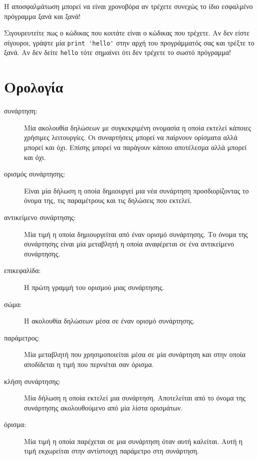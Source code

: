 \documentclass[10pt]{book}
\begin{document}
Η αποσφαλμάτωση μπορεί να είναι χρονοβόρα αν τρέχετε συνεχώς το ίδιο 
εσφαλμένο πρόγραμμα ξανά και ξανά!

Σιγουρευτείτε πως ο κώδικας που κοιτάτε είναι ο κώδικας που τρέχετε.
Αν δεν είστε σίγουροι, γράψτε μία \verb"print 'hello'" 
στην αρχή του προγράμματός σας και τρέξτε το ξανά. Αν δεν δείτε  
\verb"hello" τότε σημαίνει ότι δεν τρέχετε το σωστό πρόγραμμα!



\section{Ορολογία}

\begin{description}

\item[συνάρτηση:] Μία ακολουθία δηλώσεων με συγκεκριμένη ονομασία η οποία εκτελεί κάποιες χρήσιμες λειτουργίες. Οι συναρτήσεις μπορεί να παίρνουν ορίσματα αλλά μπορεί και όχι. Επίσης μπορεί να παράγουν κάποιο αποτέλεσμα αλλά μπορεί και όχι.

\item[ορισμός συνάρτησης:] Είναι μία δήλωση η οποία δημιουργεί μια νέα συνάρτηση προσδιορίζοντας το όνομα της, τις παραμέτρους και τις δηλώσεις που εκτελεί.

\item[αντικείμενο συνάρτησης:] Μία τιμή η οποία δημιουργείται από έναν ορισμό συνάρτησης. Το όνομα της συνάρτησης είναι μία μεταβλητή η οποία αναφέρεται σε ένα αντικείμενο συνάρτησης.

\item[επικεφαλίδα:] Η πρώτη γραμμή του ορισμού μιας συνάρτησης.

\item[σώμα:] Η ακολουθία δηλώσεων μέσα σε έναν ορισμό συνάρτησης.

\item[παράμετρος:] Μία μεταβλητή που χρησιμοποιείται μέσα σε μία συνάρτηση και 
στην οποία αποδίδεται η τιμή που περνιέται σαν όρισμα.

\item[κλήση συνάρτησης:] Μία δήλωση η οποία εκτελεί μια συνάρτηση. Αποτελείται από το όνομα της συνάρτησης ακολουθούμενο από μία λίστα ορισμάτων.

\item[όρισμα:] Μία τιμή η οποία παρέχεται σε μια συνάρτηση όταν αυτή καλείται.
Αυτή η τιμή εκχωρείται στην αντίστοιχη παράμετρο στη συνάρτηση.


\end{description}
\end{document}
